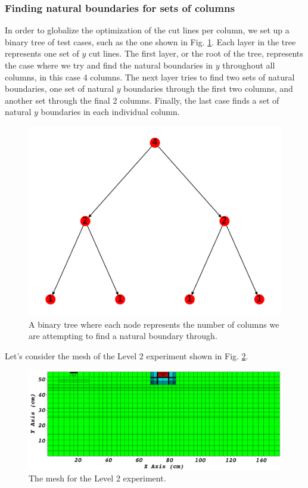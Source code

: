 \FloatBarrier
\subsubsection{Finding natural boundaries for sets of columns}
In order to globalize the optimization of the cut lines per column, we set up a binary tree of test cases, such as the one shown in Fig. \ref{binary_tree}. Each layer in the tree represents one set of $y$ cut lines. The first layer, or the root of the tree, represents the case where we try and find the natural boundaries in $y$ throughout all columns, in this case 4 columns. The next layer tries to find two sets of natural boundaries, one set of natural $y$ boundaries through the first two columns, and another set through the final 2 columns. Finally, the last case finds a set of natural $y$ boundaries in each individual column. 

\begin{figure}[h]
\centering
\includegraphics[scale=0.75]{../figures/binary_tree.pdf}
\caption{A binary tree where each node represents the number of columns we are attempting to find a natural boundary through.}
\label{binary_tree}
\end{figure}

Let's consider the mesh of the Level 2 experiment shown in Fig. \ref{level2_nocut}. 

\begin{figure}[h]
\centering
\includegraphics[scale=0.3]{../../figures/level2_nocut.png}
\caption{The mesh for the Level 2 experiment.}
\label{level2_nocut}
\end{figure}

